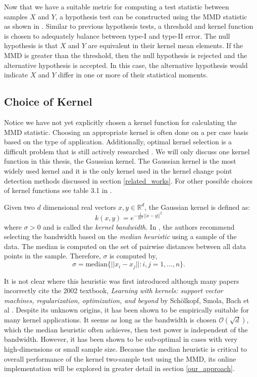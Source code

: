 Now that we have a suitable metric for computing a test statistic between samples $X$ and $Y$, a hypothesis test can be constructed using the MMD statistic as shown in \cite{gretton2012kernel}. Similar to previous hypothesis tests, a threshold and kernel function is chosen to adequately balance between type-I and type-II error. The null hypothesis is that $X$ and $Y$ are equivalent in their kernel mean elements.  If the MMD is greater than the threshold, then the null hypothesis is rejected and the alternative hypothesis is accepted. In this case, the alternative hypothesis would indicate $X$ and $Y$ differ in one  or more of their statistical moments.

\subsection{Choice of Kernel}
Notice we have not yet explicitly chosen a kernel function for calculating the MMD statistic. Choosing an appropriate kernel is often done on a per case basis based on the type of application. Additionally, optimal kernel selection is a difficult problem that is still actively researched \cite{fukumizu2009kernel} \cite{gretton2012optimal}. We will only discuss one kernel function in this thesis, the Gaussian kernel. The Gaussian kernel is the most widely used kernel and it is the only kernel used in the kernel change point detection methods discussed in section \ref{related_works}.  For other possible choices of kernel functions see table 3.1 in \cite{muandet2017kernel}.

Given two $d$ dimensional real vectors $x, y \in \mathbb{R}^d$, the Gaussian kernel is defined as:
\begin{equation}
k(x, y)= e^{-\frac{1}{2\sigma^2}||x-y||^2}
\end{equation}
where $\sigma > 0$ and is called the \textit{kernel bandwidth}. In \cite{gretton2005kernel}, the authors recommend selecting the bandwidth based on the \textit{median heuristic} using a sample of the data. The median is computed on the set of pairwise distances between all data points in the sample. Therefore, $\sigma$ is computed by, 
\begin{equation}
\sigma=\text{median}\{||x_i-x_j||:i,j = 1,...,n \}.
\end{equation}

It is not clear where this heuristic was first introduced although many papers incorrectly cite the 2002 textbook, \textit{Learning with kernels: support vector machines, regularization, optimization, and beyond} by Sch{\"o}lkopf, Smola, Bach et al \cite{garreau2017large}. Despite its unknown origins, it has been shown to be empirically suitable for many kernel applications. It seems as long as the bandwidth is chosen $\mathcal{O}(\sqrt{d})$, which the median heuristic often achieves, then test power is independent of the bandwidth. However, it has been shown to be sub-optimal in cases with very high-dimensions \cite{muandet2014kernel} or small sample size\cite{ramdas2015decreasing}. Because the median heuristic is critical to overall performance of the kernel two-sample test using the MMD, its online implementation will be explored in greater detail in section \ref{our_approach}.
 
